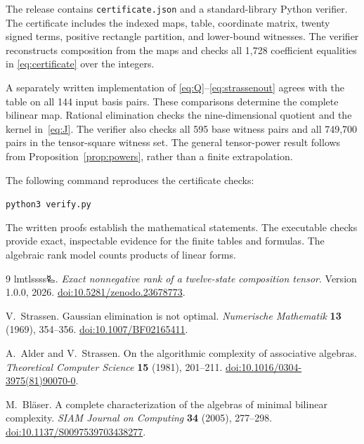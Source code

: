 \documentclass[11pt,a4paper]{article}
\begin{document}
The release contains \texttt{certificate.json} and a standard-library
Python verifier. The certificate includes the indexed maps, table,
coordinate matrix, twenty signed terms, positive rectangle partition,
and lower-bound witnesses. The verifier reconstructs composition from
the maps and checks all 1,728 coefficient equalities in
\eqref{eq:certificate} over the integers.

A separately written implementation of
\eqref{eq:Q}--\eqref{eq:strassenout} agrees with the table on all
144 input basis pairs. These comparisons determine the complete
bilinear map. Rational elimination checks the nine-dimensional quotient
and the kernel in~\eqref{eq:J}. The verifier also checks all 595 base
witness pairs and all 749,700 pairs in the tensor-square witness set.
The general tensor-power result follows from
Proposition~\ref{prop:powers}, rather than a finite extrapolation.

The following command reproduces the certificate checks:
\begin{center}\texttt{python3 verify.py}\end{center}
The written proofs establish the mathematical statements. The executable
checks provide exact, inspectable evidence for the finite tables and
formulas. The algebraic rank model counts products of linear forms.

\begin{thebibliography}{9}
lmtlssss{\authorsymbol 🜐}.
\emph{Exact nonnegative rank of a twelve-state composition tensor}.
Version 1.0.0, 2026.
\href{https://doi.org/10.5281/zenodo.23678773}{doi:10.5281/zenodo.23678773}.

V.~Strassen.
Gaussian elimination is not optimal.
\emph{Numerische Mathematik} \textbf{13} (1969), 354--356.
\href{https://doi.org/10.1007/BF02165411}{doi:10.1007/BF02165411}.

A.~Alder and V.~Strassen.
On the algorithmic complexity of associative algebras.
\emph{Theoretical Computer Science} \textbf{15} (1981), 201--211.
\href{https://doi.org/10.1016/0304-3975(81)90070-0}{doi:10.1016/0304-3975(81)90070-0}.

M.~Bl\"aser.
A complete characterization of the algebras of minimal bilinear complexity.
\emph{SIAM Journal on Computing} \textbf{34} (2005), 277--298.
\href{https://doi.org/10.1137/S0097539703438277}{doi:10.1137/S0097539703438277}.
\end{thebibliography}
\end{document}
